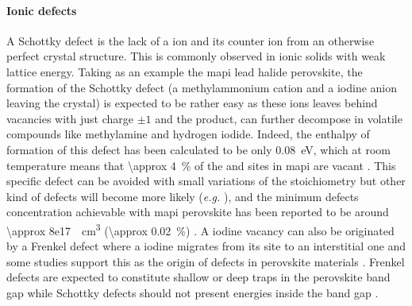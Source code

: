 \paragraph{Ionic defects}
	A Schottky defect is the lack of a ion and its counter ion from an otherwise perfect crystal structure.
	This is commonly observed in ionic solids with weak lattice energy.
	Taking as an example the \gls{mapi} lead halide perovskite, the formation of the Schottky defect  (a methylammonium cation and a iodine anion leaving the crystal) is expected to be rather easy as these ions leaves behind vacancies with just charge $\pm 1$ and the product,  can further decompose in volatile compounds like methylamine and hydrogen iodide.
	Indeed, the enthalpy of formation of this defect has been calculated to be only \SI{0.08}{\eV}, which at room temperature means that \SI{\approx 4}{\%} of the  and  sites in \gls{mapi} are vacant \cite{Walsh2015,Yin2014}.
	This specific defect can be avoided with small variations of the stoichiometry but other kind of defects will become more likely (\textsl{e.g.} ), and the minimum defects concentration achievable with \gls{mapi} perovskite has been reported to be around \SI{\approx 8e17}{\per\cubic\cm} (\SI{\approx 0.02}{\%}) \cite{Walsh2015}.
	A iodine vacancy can also be originated by a Frenkel defect where a iodine migrates from its site to an interstitial one  and some studies support this as the origin of defects in perovskite materials \cite{Birkhold2018,Birkhold2018a,Minns2017,Mosconi2016}.
	Frenkel defects are expected to constitute shallow or deep traps in the perovskite band gap while Schottky defects should not present energies inside the band gap \cite{Kim2014h,Yin2014,Buin2014,Du2015}.

